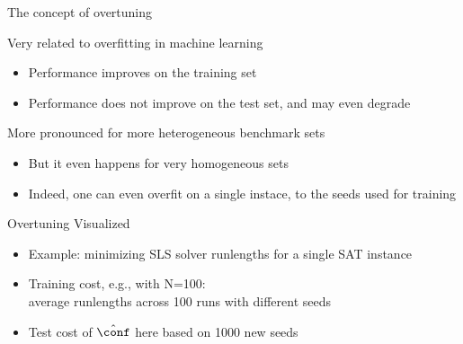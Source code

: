 \begin{frame}[fragile]{The concept of overtuning}

Very related to overfitting in machine learning 
\begin{itemize}
	\item Performance improves on the training set
	\item Performance does not improve on the test set, and may even degrade
\end{itemize}	

More pronounced for more heterogeneous benchmark sets 
\begin{itemize}
	\item But it even happens for very homogeneous sets
	\item Indeed, one can even overfit on a single instace, to the \alert{seeds} used for training 
\end{itemize}	

\end{frame}

\begin{frame}[fragile]{Overtuning Visualized}

\begin{itemize}
	\item Example: minimizing SLS solver runlengths for a single SAT instance
	\item \alert{Training cost}, e.g., with N=100:\\average runlengths across 100 runs with different seeds
	\item \alert{Test cost} of $\hat{\conf}$ here based on 1000 new seeds 
\end{itemize}	

\pause


\begin{center}
\end{center}


\end{frame}

